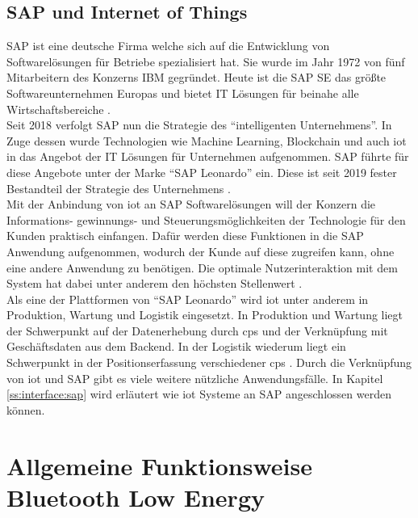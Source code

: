 \subsection{SAP und Internet of Things}
\label{ss:grundlagen:sap}

\noindent SAP ist eine deutsche Firma welche sich auf die Entwicklung von Softwarelösungen für Betriebe spezialisiert hat. Sie wurde im Jahr 1972 von fünf Mitarbeitern des Konzerns IBM gegründet. Heute ist die SAP SE das größte Softwareunternehmen Europas und bietet IT Lösungen für beinahe alle Wirtschaftsbereiche \cite{SAP20:WWW}.\\

\noindent Seit 2018 verfolgt SAP nun die Strategie des "`intelligenten Unternehmens"'. In Zuge dessen wurde Technologien wie Machine Learning, Blockchain und auch \ac{iot} in das Angebot der IT Lösungen für Unternehmen aufgenommen. SAP führte für diese Angebote unter der Marke "`SAP Leonardo"' ein. Diese ist seit 2019 fester Bestandteil der Strategie des Unternehmens \cite[Seite 102f]{Holtschulte20:IOS}.\\ 

\noindent Mit der Anbindung von \ac{iot} an SAP Softwarelösungen will der Konzern die Informations- gewinnungs- und Steuerungsmöglichkeiten der Technologie für den Kunden praktisch einfangen. Dafür werden diese Funktionen in die SAP Anwendung aufgenommen, wodurch der Kunde auf diese zugreifen kann, ohne eine andere Anwendung zu benötigen. Die optimale Nutzerinteraktion mit dem System hat dabei unter anderem den höchsten Stellenwert \cite[Seite 105f]{Holtschulte20:IOS}.\\

\noindent Als eine der Plattformen von "`SAP Leonardo"' wird \ac{iot} unter anderem in Produktion, Wartung und Logistik eingesetzt. In Produktion und Wartung liegt der Schwerpunkt auf der Datenerhebung durch \ac{cps} und der Verknüpfung mit Geschäftsdaten aus dem Backend. In der Logistik wiederum liegt ein Schwerpunkt in der Positionserfassung verschiedener \ac{cps} \cite[Seite 107ff]{Holtschulte20:IOS}. Durch die Verknüpfung von \ac{iot} und SAP gibt es viele weitere nützliche Anwendungsfälle. In Kapitel \ref{ss:interface:sap} wird erläutert wie \ac{iot} Systeme an SAP angeschlossen werden können.\\

\section{Allgemeine Funktionsweise Bluetooth Low Energy}
\label{s:funktionsweise}

